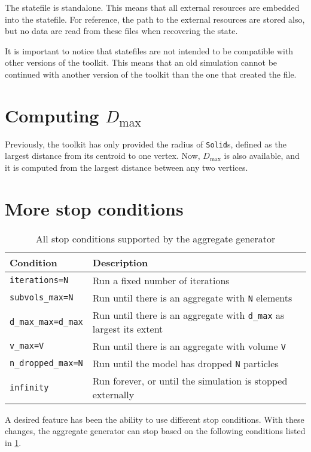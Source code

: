 \documentclass[a4paper,10pt]{scrartcl}
\begin{document}
The statefile is standalone. This means that all external resources are embedded into the statefile. For reference, the path to the external resources are stored also, but no data are read from these files when recovering the state.

It is important to notice that statefiles are not intended to be compatible with other versions of the toolkit. This means that an old simulation cannot be continued with another version of the toolkit than the one that created the file.

\section{Computing $D_\text{max}$}
Previously, the toolkit has only provided the radius of \texttt{Solid}s, defined as the largest distance from its centroid to one vertex. Now, $D_\text{max}$ is also available, and it is computed from the largest distance between any two vertices. 

\section{More stop conditions}
\begin{table}
 \caption{\label{stopcond}All stop conditions supported by the aggregate generator}
 \begin{tabular}{p{}p{}}
 \hline
 \hline
  \textbf{Condition} & \textbf{Description}\\
  \hline
  \texttt{iterations=N} &  Run a fixed number of iterations \\
  \texttt{subvols\_max=N}              &  Run until there is an aggregate with \texttt{N} elements \\
  \texttt{d\_max\_max=d\_max}            &  Run until there is an aggregate with \texttt{d\_max} as largest its extent \\
  \texttt{v\_max=V}                     & Run until there is an aggregate with volume \texttt{V} \\
  \texttt{n\_dropped\_max=N}           & Run until the model has dropped \texttt{N} particles \\
  \texttt{infinity}                    & Run forever, or until the simulation is stopped externally \\
  \hline
  \hline
 \end{tabular}
\end{table}

A desired feature has been the ability to use different stop conditions. With these changes, the aggregate generator can stop based on the following conditions listed in \cref{stopcond}.
\end{document}
